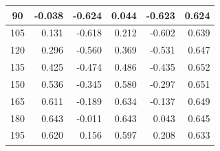 \begin{table}[htbp]
\begin{center}
\begin{tabular}{|p{20mm}|p{20mm}|p{20mm}|p{20mm}|p{20mm}|p{20mm}|}
      \multicolumn{1}{|c|}{90}                      & \multicolumn{1}{|r|}{-0.038}               & \multicolumn{1}{|r|}{-0.624}               & \multicolumn{1}{|r|}{0.044}                & \multicolumn{1}{|r|}{-0.623}               & \multicolumn{1}{|r|}{0.624}                    \\ \hline
      \multicolumn{1}{|c|}{105}                     & \multicolumn{1}{|r|}{0.131}                & \multicolumn{1}{|r|}{-0.618}               & \multicolumn{1}{|r|}{0.212}                & \multicolumn{1}{|r|}{-0.602}               & \multicolumn{1}{|r|}{0.639}                    \\ \hline
      \multicolumn{1}{|c|}{120}                     & \multicolumn{1}{|r|}{0.296}                & \multicolumn{1}{|r|}{-0.560}               & \multicolumn{1}{|r|}{0.369}                & \multicolumn{1}{|r|}{-0.531}               & \multicolumn{1}{|r|}{0.647}                    \\ \hline
      \multicolumn{1}{|c|}{135}                     & \multicolumn{1}{|r|}{0.425}                & \multicolumn{1}{|r|}{-0.474}               & \multicolumn{1}{|r|}{0.486}                & \multicolumn{1}{|r|}{-0.435}               & \multicolumn{1}{|r|}{0.652}                    \\ \hline
      \multicolumn{1}{|c|}{150}                     & \multicolumn{1}{|r|}{0.536}                & \multicolumn{1}{|r|}{-0.345}               & \multicolumn{1}{|r|}{0.580}                & \multicolumn{1}{|r|}{-0.297}               & \multicolumn{1}{|r|}{0.651}                    \\ \hline
      \multicolumn{1}{|c|}{165}                     & \multicolumn{1}{|r|}{0.611}                & \multicolumn{1}{|r|}{-0.189}               & \multicolumn{1}{|r|}{0.634}                & \multicolumn{1}{|r|}{-0.137}               & \multicolumn{1}{|r|}{0.649}                    \\ \hline
      \multicolumn{1}{|c|}{180}                     & \multicolumn{1}{|r|}{0.643}                & \multicolumn{1}{|r|}{-0.011}               & \multicolumn{1}{|r|}{0.643}                & \multicolumn{1}{|r|}{0.043}                & \multicolumn{1}{|r|}{0.645}                    \\ \hline
      \multicolumn{1}{|c|}{195}                     & \multicolumn{1}{|r|}{0.620}                & \multicolumn{1}{|r|}{0.156}                & \multicolumn{1}{|r|}{0.597}                & \multicolumn{1}{|r|}{0.208}                & \multicolumn{1}{|r|}{0.633}                    \\ \hline

\end{tabular}
\end{center}
\end{table}
